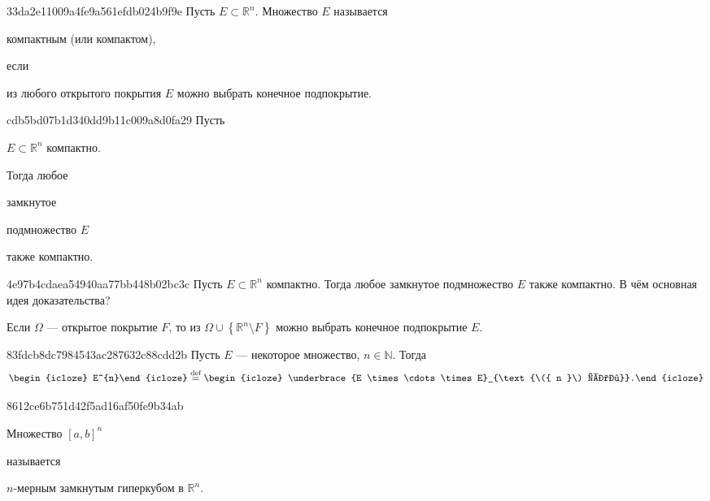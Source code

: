 \begin{note}{33da2e11009a4fe9a561efdb024b9f9e}
    Пусть \({ E \subset \mathbb R^{n} }\).
    Множество \({ E }\) называется \begin{icloze}{2}компактным (или компактом),\end{icloze} если \begin{icloze}{1}из любого открытого покрытия \({ E }\) можно выбрать конечное подпокрытие.\end{icloze}
\end{note}

\begin{note}{cdb5bd07b1d340dd9b11c009a8d0fa29}
    Пусть \begin{icloze}{3}\({ E \subset \mathbb R^{n} }\) компактно.\end{icloze}
    Тогда любое \begin{icloze}{1}замкнутое\end{icloze} подмножество \({ E }\) \begin{icloze}{2}также компактно.\end{icloze}
\end{note}

\begin{note}{4e97b4cdaea54940aa77bb448b02bc3c}
    Пусть \({ E \subset \mathbb R^{n} }\) компактно.
    Тогда любое замкнутое подмножество \({ E }\) также компактно.
    В чём основная идея доказательства?

    \begin{cloze}{1}
        Если \({ \Omega }\) --- открытое покрытие \({ F }\), то из \({ \Omega \cup \left\{ \mathbb R^{n} \setminus F \right\} }\) можно выбрать конечное подпокрытие \({ E }\).
    \end{cloze}
\end{note}

\begin{note}{83fdcb8dc7984543ac287632c88cdd2b}
    Пусть \({ E }\) --- некоторое множество,\: \({ n \in \mathbb N }\). Тогда
    \[
        \begin{icloze}{2}E^{n}\end{icloze} \overset{\text{def}}= \begin{icloze}{1}\underbrace{E \times \cdots \times E}_{\text{\({ n }\) раз}}.\end{icloze}
    \]
\end{note}

\begin{note}{8612ce6b751d42f5ad16af50fe9b34ab}
    \begin{icloze}{1}Множество \({ [a, b]^{n} }\)\end{icloze} называется \begin{icloze}{2}\({ n }\)-мерным замкнутым гиперкубом в \({ \mathbb R^{n} }\).\end{icloze}
\end{note}

